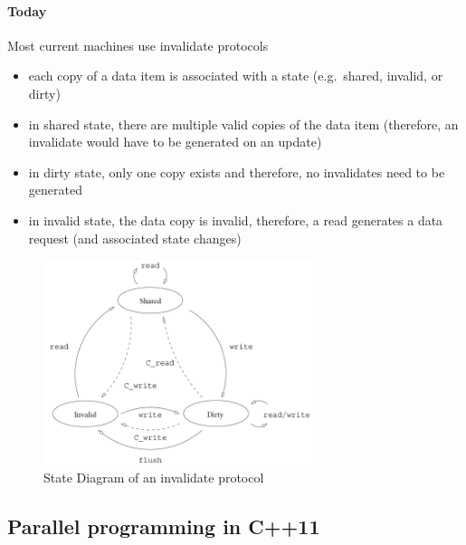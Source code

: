 \hypertarget{today}{%
\paragraph{Today}\label{today}}

Most current machines use invalidate protocols

\begin{itemize}
\tightlist
\item
  each copy of a data item is associated with a state (e.g.~shared,
  invalid, or dirty)
\item
  in shared state, there are multiple valid copies of the data item
  (therefore, an invalidate would have to be generated on an update)
\item
  in dirty state, only one copy exists and therefore, no invalidates
  need to be generated
\item
  in invalid state, the data copy is invalid, therefore, a read
  generates a data request (and associated state changes)
\end{itemize}

\begin{figure}[H]
\centering
\includegraphics[width=0.7\textwidth]{figures/states-invalidate-protocols.png}
\caption{State Diagram of an invalidate protocol}
\end{figure}

\hypertarget{parallel-programming-in-c11}{%
\subsection{Parallel programming in
C++11}\label{parallel-programming-in-c11}}

